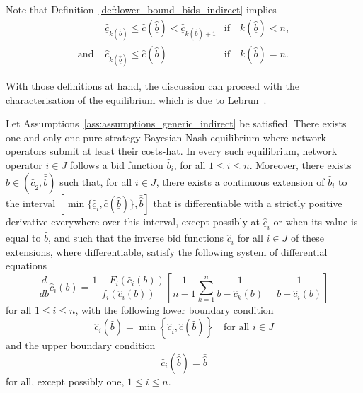 \noindent Note that Definition~\ref{def:lower_bound_bids_indirect} implies
\begin{equation}
  \label{eq:bounds_lower_bound_bids_cost_indirect}
  \begin{array}{lll}
    &\underline{\hat{c}}_{k(\underline{\hat{b}})} \leq \hat{c}(\underline{\hat{b}}) < \underline{\hat{c}}_{k(\underline{\hat{b}})+1} &\textrm{if}\quad k(\underline{\hat{b}}) < n,\\
    \textrm{and } 
    &\underline{\hat{c}}_{k(\underline{\hat{b}})} \leq \hat{c}(\underline{\hat{b}}) &\textrm{if}\quad k(\underline{\hat{b}}) = n.
  \end{array}
\end{equation}

With those definitions at hand, the discussion can proceed with the characterisation of the equilibrium which is due to Lebrun~\cite{Lebrun2006}.
\begin{proposition}
\label{prop:characterization_of_the_equilibrium_indirect}
Let Assumptions~\ref{ass:assumptions_generic_indirect} be satisfied. There exists one and only one pure-strategy Bayesian Nash equilibrium where network operators submit at least their costs-hat. In every such equilibrium, network operator $i\in J$ follows a bid function $\hat{b}_i$, for all $1\leq i\leq n$. Moreover, there exists $\underline{\hat{b}}\in (\underline{\hat{c}}_2, \bar{\hat{b}})$ such that, for all $i\in J$, there exists a continuous extension of $\hat{b}_i$ to the interval $\left[\min\{\underline{\hat{c}}_i, \hat{c}(\underline{\hat{b}})\}, \bar{\hat{b}}\right]$ that is differentiable with a strictly positive derivative everywhere over this interval, except possibly at $\underline{\hat{c}}_i$ or when its value is equal to $\bar{\hat{b}}$, and such that the inverse bid functions $\hat{c}_i$ for all $i\in J$ of these extensions, where differentiable, satisfy the following system of differential equations
\begin{equation}
  \label{eq:foc_ode_indirect}
  \frac{d}{db}\hat{c}_i(b) = \frac{1 - F_i(\hat{c}_i(b))}{f_i(\hat{c}_i(b))}\left[ \frac{1}{n-1}\sum_{k=1}^n \frac{1}{b-\hat{c}_k(b)} - \frac{1}{b-\hat{c}_i(b)} \right]
\end{equation}
for all $1\leq i\leq n$, with the following lower boundary condition
\begin{equation}
  \label{eq:foc_ode_lower_boundary_indirect}
  \hat{c}_i(\underline{\hat{b}}) = \min\left\{\underline{\hat{c}}_i, \hat{c}(\underline{\hat{b}})\right\} \quad\textrm{for all }i\in J
\end{equation}
and the upper boundary condition
\begin{equation}
  \label{eq:foc_ode_upper_boundary_indirect}
  \hat{c}_i(\bar{\hat{b}}) = \bar{\hat{b}}
\end{equation}
for all, except possibly one, $1\leq i\leq n$.
\end{proposition}
